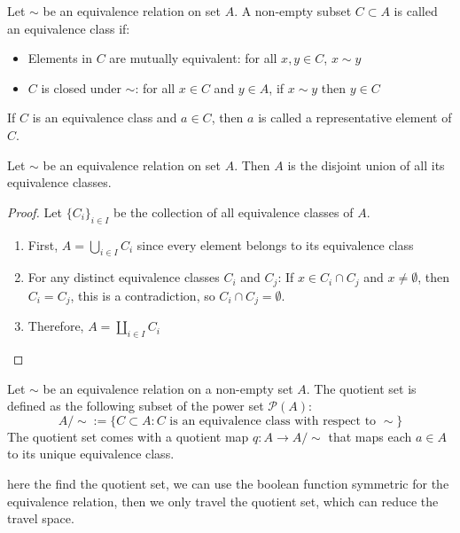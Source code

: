 \documentclass[11pt,lang=en]{elegantbook}
\begin{document}
\begin{definition}
  Let $\sim$ be an equivalence relation on set $A$. A non-empty subset $C \subset A$ is called an equivalence class if:
  \begin{itemize}
    \item Elements in $C$ are mutually equivalent: for all $x,y \in C$, $x \sim y$
    \item $C$ is closed under $\sim$: for all $x \in C$ and $y \in A$, if $x \sim y$ then $y \in C$
  \end{itemize}
  If $C$ is an equivalence class and $a \in C$, then $a$ is called a representative element of $C$.
\end{definition}

\begin{proposition}
  Let $\sim$ be an equivalence relation on set $A$. Then $A$ is the disjoint union of all its equivalence classes.
\end{proposition}

\begin{proof}
  Let $\{C_i\}_{i \in I}$ be the collection of all equivalence classes of $A$.
  \begin{enumerate}
    \item First, $A = \bigcup_{i \in I} C_i$ since every element belongs to its equivalence class
    \item For any distinct equivalence classes $C_i$ and $C_j$:
      If $x \in C_i \cap C_j$ and $x\neq \emptyset $, then $C_i = C_j$, this is a contradiction, so $C_i \cap C_j = \emptyset$.
    \item Therefore, $A = \coprod_{i \in I} C_i$
  \end{enumerate}
\end{proof}

\begin{definition}
  Let $\sim$ be an equivalence relation on a non-empty set $A$. The quotient set is defined as the following subset of the power set $\mathcal{P}(A)$:
  \[
    A/{\sim} := \{C \subset A : C \text{ is an equivalence class with respect to } \sim\}
  \]
  The quotient set comes with a quotient map $q: A \to A/{\sim}$ that maps each $a \in A$ to its unique equivalence class.
\end{definition}

\begin{remark}
  here the find the quotient set, we can use the boolean function symmetric for the equivalence relation, then we only travel the quotient set, which can reduce the travel space.
\end{remark}
\end{document}
